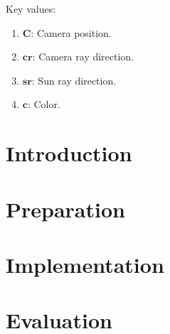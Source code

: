 \documentclass[12pt,a4paper,twoside,openright]{report}
\begin{document}
Key values:

\begin{enumerate}
    \item $\mathbf{C}$: Camera position.
    \item $\mathbf{cr}$: Camera ray direction.
    \item $\mathbf{sr}$: Sun ray direction.
    \item $\mathbf{c}$: Color. 
\end{enumerate}



\newpage 

\tableofcontents


\newpage
{}
\setcounter{page}{1}







\chapter{Introduction}


\chapter{Preparation}


\chapter{Implementation}


\chapter{Evaluation}

\end{document}
